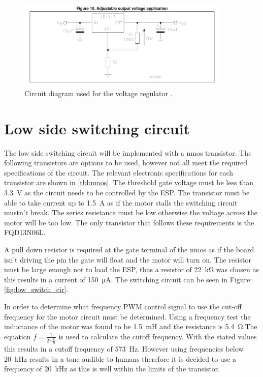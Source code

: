\begin{figure}[H]
\centering
\includegraphics[width = 0.9\textwidth]{./Figures/Volt_Reg_Diag.png}
\caption{Circuit diagram used for the voltage regulator \cite{LD1117}.}
\label{fig:volt_reg_diag}
\end{figure}

\clearpage
\section{Low side switching circuit}

The low side switching circuit will be implemented with a nmos transistor. The following transistors are options to be used, however not all meet the required specifications of the circuit. The relevant electronic specifications for each transistor are shown in \ref{tbl:nmos}. The threshold gate voltage must be less than \SI{3.3}{\volt} as the circuit needs to be controlled by the ESP. The transistor must be able to take current up to \SI{1.5}{\ampere} as if the motor stalls the switching circuit mustn't break. The series resistance must be low otherwise the voltage across the motor will be too low. The only transistor that follows these requirements is the FQD13N06L.

A pull down resistor is required at the gate terminal of the nmos as if the board isn't driving the pin the gate will float and the motor will turn on. The resistor must be large enough not to load the ESP, thus a resistor of \SI{22}{\kilo\ohm} was chosen as this results in a current of \SI{150}{\micro\ampere}. The switching circuit can be seen in Figure:\ref{fig:low_switch_cir}.

In order to determine what frequency PWM control signal to use the cut-off frequency for the motor circuit must be determined. Using a frequency test the inductance of the motor was found to be \SI{1.5}{\milli\henry} and the resistance is \SI{5.4}{\ohm}.The equation $f = \frac{1}{2 \pi \frac{L}{R}}$ is used to calculate the cutoff frequency. With the stated values this results in a cutoff frequency of \SI{573}{\hertz}. However using frequencies below \SI{20}{\kilo\hertz} results in a tone audible to humans therefore it is decided to use a frequency of \SI{20}{\kilo\hertz} as this is well within the limits of the transistor.

